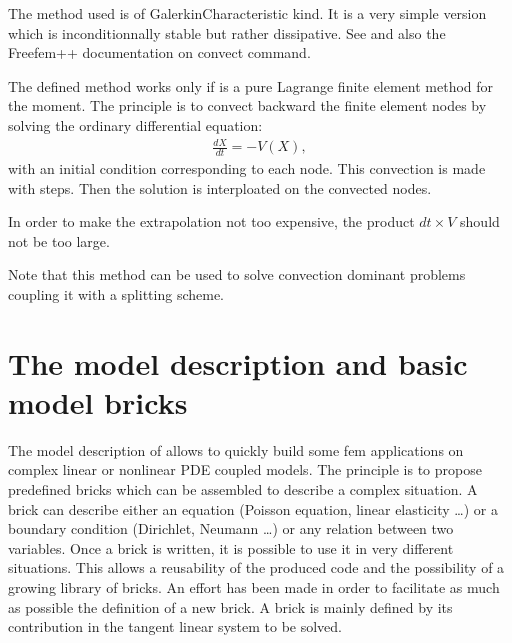 \documentclass[a4paper,11pt,english]{sphinxmanual}
\begin{document}
The method used is of Galerkin\sphinxhyphen{}Characteristic kind. It is a very simple version
which is inconditionnally stable but rather dissipative. See  and also the Freefem++ documentation on convect
command.

The defined method works only if  is a pure Lagrange finite element method
for the moment. The principle is to convect backward the finite element nodes by solving the ordinary differential equation:
\begin{equation*}
\begin{split}\frac{d X}{d t} = -V(X),\end{split}
\end{equation*}
with an initial condition corresponding to each node. This convection is made with  steps. Then the solution is interploated on
the convected nodes.

In order to make the extrapolation not too expensive, the product \(dt\times V\)
should not be too large.

Note that this method can be used to solve convection dominant problems coupling it with a splitting scheme.

\ignorespaces 

\chapter{The model description and basic model bricks}
\label{\detokenize{userdoc/model:the-model-description-and-basic-model-bricks}}\label{\detokenize{userdoc/model:ud-model}}\label{\detokenize{userdoc/model:index-0}}\label{\detokenize{userdoc/model::doc}}
The model description of  allows
to quickly build some fem applications on complex linear or nonlinear PDE coupled
models. The principle is to propose predefined bricks which can be assembled to
describe a complex situation. A brick can describe either an equation (Poisson
equation, linear elasticity …) or a boundary condition (Dirichlet, Neumann …)
or any relation between two variables. Once a brick is written, it is possible to
use it in very different situations. This allows a reusability of the produced
code and the possibility of a growing library of bricks. An effort has been made in
order to facilitate as much as possible the definition of a new brick. A brick is
mainly defined by its contribution in the tangent linear system to be solved.
\end{document}
